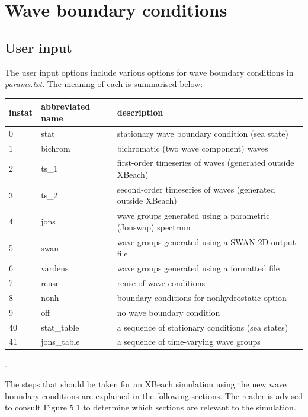 \section{Wave boundary conditions}
\subsection{ User input}

The user input options include various options for wave boundary conditions in \textit{params.txt}. The meaning of each is summarised below:

\begin{tabular}{|p{0.5in}|p{0.8in}|p{2.6in}|} \hline 
instat & abbreviated name & description \\ \hline 
0 & stat & stationary wave boundary condition (sea state) \\ \hline 
1 & bichrom & bichromatic (two wave component) waves \\ \hline 
2 & ts\_1 & first-order timeseries of waves (generated outside XBeach) \\ \hline 
3 & ts\_2 & second-order timeseries of waves (generated outside XBeach) \\ \hline 
4 & jons & wave groups generated using a parametric (Jonswap) spectrum \\ \hline 
5 & swan & wave groups generated using a SWAN 2D output file \\ \hline 
6 & vardens & wave groups generated using a formatted file \\ \hline 
7 & reuse & reuse of wave conditions \\ \hline 
8 & nonh & boundary conditions for nonhydrostatic option \\ \hline 
9 & off & no wave boundary condition \\ \hline 
40 & stat\_table & a sequence of stationary conditions (sea states) \\ \hline 
41 & jons\_table & a sequence of time-varying wave groups \\ \hline 
\end{tabular}

.

The steps that should be taken for an XBeach simulation using the new wave boundary conditions are explained in the following sections. The reader is advised to consult Figure 5.1 to determine which sections are relevant to the simulation.

